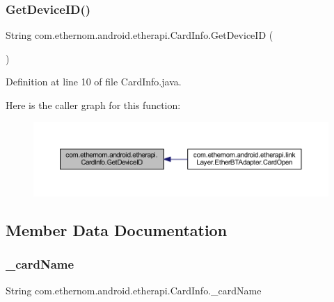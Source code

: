 \subsubsection{\texorpdfstring{Get\+Device\+I\+D()}{GetDeviceID()}}
{\footnotesize\ttfamily String com.\+ethernom.\+android.\+etherapi.\+Card\+Info.\+Get\+Device\+ID (\begin{DoxyParamCaption}{ }\end{DoxyParamCaption})}



Definition at line 10 of file Card\+Info.\+java.

Here is the caller graph for this function\+:\nopagebreak
\begin{figure}[H]
\begin{center}
\leavevmode
\includegraphics[width=350pt]{classcom_1_1ethernom_1_1android_1_1etherapi_1_1_card_info_af56039cd0223acddde740b8518b4a454_icgraph}
\end{center}
\end{figure}


\subsection{Member Data Documentation}
\mbox{\label{classcom_1_1ethernom_1_1android_1_1etherapi_1_1_card_info_a503aeab1d921778a53c1769abeb559fa}} 
\subsubsection{\texorpdfstring{\+\_\+card\+Name}{\_cardName}}
{\footnotesize\ttfamily String com.\+ethernom.\+android.\+etherapi.\+Card\+Info.\+\_\+card\+Name\hspace{0.3cm}{\ttfamily [package]}}



